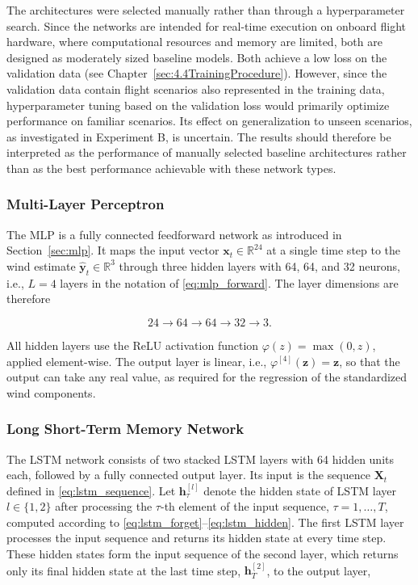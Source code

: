 The architectures were selected manually rather than through a hyperparameter search. Since the networks are intended for real-time execution on onboard flight hardware, where computational resources and memory are limited, both are designed as moderately sized baseline models. Both achieve a low loss on the validation data (see Chapter~\ref{sec:4.4TrainingProcedure}). However, since the validation data contain flight scenarios also represented in the training data, hyperparameter tuning based on the validation loss would primarily optimize performance on familiar scenarios. Its effect on generalization to unseen scenarios, as investigated in Experiment B, is uncertain. The results should therefore be interpreted as the performance of manually selected baseline architectures rather than as the best performance achievable with these network types.



\subsubsection{Multi-Layer Perceptron}

The MLP is a fully connected feedforward network as introduced in Section~\ref{sec:mlp}. It maps the input vector $\bm{x}_t \in \mathbb{R}^{24}$ at a single time step to the wind estimate $\hat{\bm{y}}_t \in \mathbb{R}^{3}$ through three hidden layers with 64, 64, and 32 neurons, i.e., $L = 4$ layers in the notation of \eqref{eq:mlp_forward}. The layer dimensions are therefore

\begin{equation}
	24 \rightarrow 64 \rightarrow 64 \rightarrow 32 \rightarrow 3 .
\end{equation}

All hidden layers use the ReLU activation function $\varphi(z) = \max(0, z)$, applied element-wise. The output layer is linear, i.e., $\varphi^{[4]}(\bm{z}) = \bm{z}$, so that the output can take any real value, as required for the regression of the standardized wind components.



\subsubsection{Long Short-Term Memory Network}

The LSTM network consists of two stacked LSTM layers with 64 hidden units each, followed by a fully connected output layer. Its input is the sequence $\bm{X}_t$ defined in \eqref{eq:lstm_sequence}. Let $\bm{h}^{[l]}_\tau$ denote the hidden state of LSTM layer $l \in \{1, 2\}$ after processing the $\tau$-th element of the input sequence, $\tau = 1, \dots, T$, computed according to \eqref{eq:lstm_forget}--\eqref{eq:lstm_hidden}. The first LSTM layer processes the input sequence and returns its hidden state at every time step. These hidden states form the input sequence of the second layer, which returns only its final hidden state at the last time step, $\bm{h}^{[2]}_T$, to the output layer,


